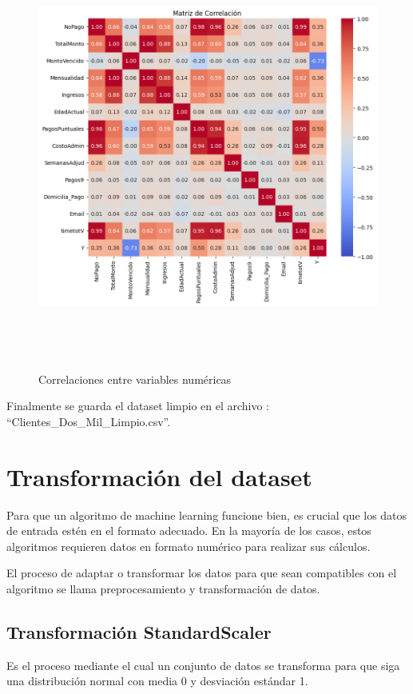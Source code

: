 \begin{figure}[H]
    \centering
       \includegraphics[width=14cm, height=14cm ]{Imagenes/Correlaciones.png}
      \caption{Correlaciones entre variables numéricas}
      \label{fig:Corres}
\end{figure}

Finalmente se guarda el dataset limpio en el archivo : ``Clientes\_Dos\_Mil\_Limpio.csv''.


\section{Transformación del dataset}
Para que un algoritmo de machine learning funcione bien, es crucial que los datos de entrada estén 
en el formato adecuado. En la mayoría de los casos, estos algoritmos requieren datos en formato 
numérico para realizar sus cálculos.\medskip

El proceso de adaptar o transformar los datos para que sean compatibles con el algoritmo se llama 
preprocesamiento y transformación de datos.

\subsection{Transformación StandardScaler}
Es el proceso mediante el cual un conjunto de datos se transforma para que siga una distribución normal
con media 0 y desviación estándar 1. \medskip

